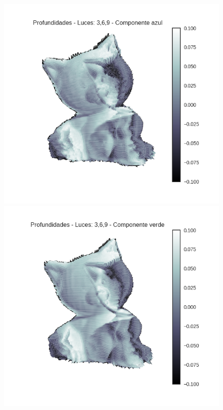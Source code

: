 \begin{figure}[H]
\centering
\begin{minipage}{.5\textwidth}
  \centering
  \includegraphics[width=1\linewidth]{informe/imagenes/profundidades/gato369Azul.png}
\end{minipage}%
\begin{minipage}{.5\textwidth}
  \centering
    \includegraphics[width=1\linewidth]{informe/imagenes/profundidades/gato369Verde.png}
\end{minipage}
\end{figure}

